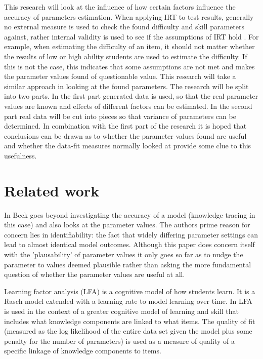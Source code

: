 \documentclass{scrartcl}
\begin{document}
This research will look at the influence of how certain factors influence the accuracy of parameters estimation. When applying IRT to test results, generally no external measure is used to check the found difficulty and skill parameters against, rather internal validity is used to see if the assumptions of IRT hold \cite{hambleton}. For example, when estimating the difficulty of an item, it should not matter whether the results of low or high ability students are used to estimate the difficulty. If this is not the case, this indicates that some assumptions are not met and makes the parameter values found of questionable value. This research will take a similar approach in looking at the found parameters. The research will be split into two parts. In the first part generated data is used, so that the real parameter values are known and effects of different factors can be estimated. In the second part real data will be cut into pieces so that variance of parameters can be determined. In combination with the first part of the research it is hoped that conclusions can be drawn as to whether the parameter values found are useful and whether the data-fit measures normally looked at provide some clue to this usefulness.

\section{Related work}
In \cite{knowledgeproblem} Beck goes beyond investigating the accuracy of a model (knowledge tracing in this case) and also looks at the parameter values. The authors prime reason for concern lies in identifiability: the fact that widely differing parameter settings can lead to almost identical model outcomes. Although this paper does concern itself with the 'plausability' of parameter values it only goes so far as to nudge the parameter to values deemed plausible rather than asking the more fundamental question of whether the parameter values are useful at all.

Learning factor analysis (LFA) \cite{lfa} is a cognitive model of how students learn. It is a Rasch model extended with a learning rate to model learning over time. In \cite{lfa} LFA is used in the context of a greater cognitive model of learning and skill that includes what knowledge components are linked to what items. The quality of fit (measured as the log likelihood of the entire data set given the model plus some penalty for the number of parameters) is used as a measure of quality of a specific linkage of knowledge components to items.
\end{document}
